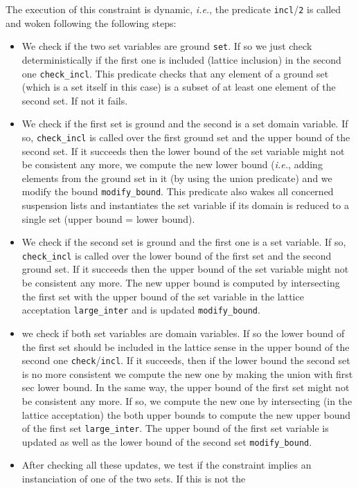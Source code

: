 The execution of  this constraint is dynamic, {\em i.e.}, the
predicate \verb/incl//\verb/2/ is called and woken following the
following steps:
\begin{itemize}
\item We check if the two set variables are ground \verb/set/. If so
we just check deterministically if the first one is included (lattice
inclusion) in the second one \verb/check_incl/. This
predicate checks that any element of a ground set (which is a set
itself in this case) is a subset of at least one element of the second
set. If not it fails.
\item We check if the first set is ground and the second is a set
domain variable. If so, \verb/check_incl/ is called over the first
ground set and the upper bound of the second set. If it succeeds then
the lower bound of the set variable might not be consistent any more,
we compute the new lower bound ({\em i.e.}, adding elements from the
ground set in it (by using the union predicate) and we modify the bound
\verb/modify_bound/. This predicate also wakes all concerned
suspension lists and instantiates the set variable if its domain is
reduced to a single set (upper bound = lower bound).
\item We check if the second set is ground and the first one is a set
variable. If so, \verb/check_incl/ is called over the lower bound of
the first set and the second ground set. If it succeeds then the upper
bound of the set variable might not be consistent any more. The new
upper bound is computed by intersecting the first set with the upper
bound of the set variable in the lattice acceptation \verb/large_inter/ and
is updated \verb/modify_bound/.
\item we check if both set variables are domain variables. If so the
lower bound of the first set should be included in the lattice sense
in the upper bound of the second one \verb/check//\verb/incl/. If it
succeeds, then if the lower bound the second set is no more consistent
we compute the new one by making the union with first sec lower bound.
In the same way, the upper bound of the first set might not be
consistent any more. If so, we compute the new one by intersecting (in
the lattice acceptation) the both upper bounds to compute the new
upper bound of the first set \verb/large_inter/. The upper bound of
the first set variable is updated as well as the lower bound of the
second set \verb/modify_bound/.
\item After checking all these updates, we test if the constraint
implies an instanciation of one of the two sets. If this is not the

\end{itemize}
